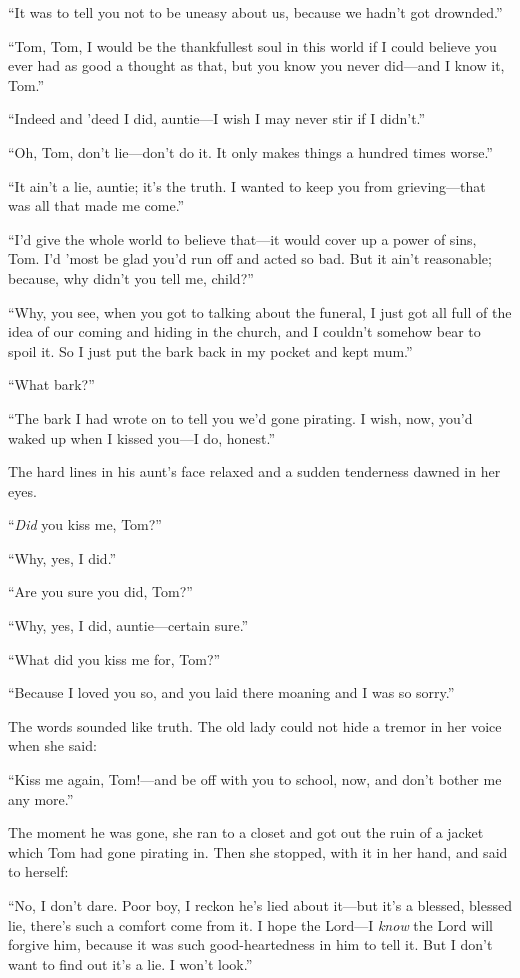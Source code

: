 \documentclass{book}
\begin{document}
“It was to tell you not to be uneasy about us, because we hadn’t got drownded.”

“Tom, Tom, I would be the thankfullest soul in this world if I could believe you ever had as good a thought as that, but you know you never did—and I know it, Tom.”

“Indeed and ’deed I did, auntie—I wish I may never stir if I didn’t.”

“Oh, Tom, don’t lie—don’t do it. It only makes things a hundred times worse.”

“It ain’t a lie, auntie; it’s the truth. I wanted to keep you from grieving—that was all that made me come.”

“I’d give the whole world to believe that—it would cover up a power of sins, Tom. I’d ’most be glad you’d run off and acted so bad. But it ain’t reasonable; because, why didn’t you tell me, child?”

“Why, you see, when you got to talking about the funeral, I just got all full of the idea of our coming and hiding in the church, and I couldn’t somehow bear to spoil it. So I just put the bark back in my pocket and kept mum.”

“What bark?”

“The bark I had wrote on to tell you we’d gone pirating. I wish, now, you’d waked up when I kissed you—I do, honest.”

The hard lines in his aunt’s face relaxed and a sudden tenderness dawned in her eyes.

“\emph{Did} you kiss me, Tom?”

“Why, yes, I did.”

“Are you sure you did, Tom?”

“Why, yes, I did, auntie—certain sure.”

“What did you kiss me for, Tom?”

“Because I loved you so, and you laid there moaning and I was so sorry.”

The words sounded like truth. The old lady could not hide a tremor in her voice when she said:

“Kiss me again, Tom!—and be off with you to school, now, and don’t bother me any more.”

The moment he was gone, she ran to a closet and got out the ruin of a jacket which Tom had gone pirating in. Then she stopped, with it in her hand, and said to herself:

“No, I don’t dare. Poor boy, I reckon he’s lied about it—but it’s a blessed, blessed lie, there’s such a comfort come from it. I hope the Lord—I \emph{know} the Lord will forgive him, because it was such good-heartedness in him to tell it. But I don’t want to find out it’s a lie. I won’t look.”
\end{document}
